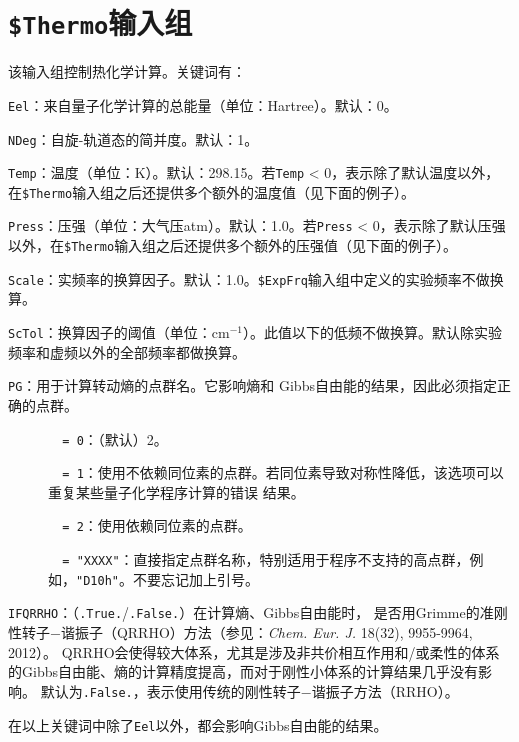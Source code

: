 \documentclass[12pt,a4paper,openany,twoside,cap,UTF8]{ctexbook}
\begin{document}
\section{\texttt{\$Thermo}输入组} \label{sec:inp-thermo}

该输入组控制热化学计算。关键词有：

\bigskip{}\noindent
\verb|Eel|：来自量子化学计算的总能量（单位：Hartree）。默认：0。

\bigskip{}\noindent
\verb|NDeg|：自旋-轨道态的简并度。默认：1。

\bigskip{}\noindent
\verb|Temp|：温度（单位：K）。默认：298.15。若\verb|Temp| < 0，表示除了默认温度以外，在\texttt{\$Thermo}输入组之后还提供多个额外的温度值（见下面的例子）。

\bigskip{}\noindent
\verb|Press|：压强（单位：大气压atm）。默认：1.0。若\verb|Press| < 0，表示除了默认压强以外，在\texttt{\$Thermo}输入组之后还提供多个额外的压强值（见下面的例子）。

\bigskip{}\noindent
\verb|Scale|：实频率的换算因子。默认：1.0。\texttt{\$ExpFrq}输入组中定义的实验频率不做换算。

\bigskip{}\noindent
\verb|ScTol|：换算因子的阈值（单位：cm$^{-1}$）。此值以下的低频不做换算。默认除实验频率和虚频以外的全部频率都做换算。

\bigskip{}\noindent
\verb|PG|：用于计算转动熵的点群名。它影响熵和 Gibbs自由能的结果，因此必须指定正确的点群。
\begin{description}
\item[ ]\verb|  = 0|：（默认）2。
\item[ ]\verb|  = 1|：使用不依赖同位素的点群。若同位素导致对称性降低，该选项可以重复某些量子化学程序计算的错误 结果。
\item[ ]\verb|  = 2|：使用依赖同位素的点群。
\item[ ]\verb|  = "XXXX"|：直接指定点群名称，特别适用于程序不支持的高点群，例如，\verb|"D10h"|。不要忘记加上引号。
\end{description}

\bigskip{}\noindent
\verb|IFQRRHO|：（\verb|.True.|/\verb|.False.|）在计算熵、Gibbs自由能时，
是否用Grimme的准刚性转子$-$谐振子（QRRHO）方法（参见：\textit{Chem. Eur. J.} 18(32), 9955-9964, 2012）。
QRRHO会使得较大体系，尤其是涉及非共价相互作用和/或柔性的体系的Gibbs自由能、熵的计算精度提高，而对于刚性小体系的计算结果几乎没有影响。
默认为\verb|.False.|，表示使用传统的刚性转子$-$谐振子方法（RRHO）。

\bigskip{}
在以上关键词中除了\verb|Eel|以外，都会影响Gibbs自由能的结果。
\end{document}
